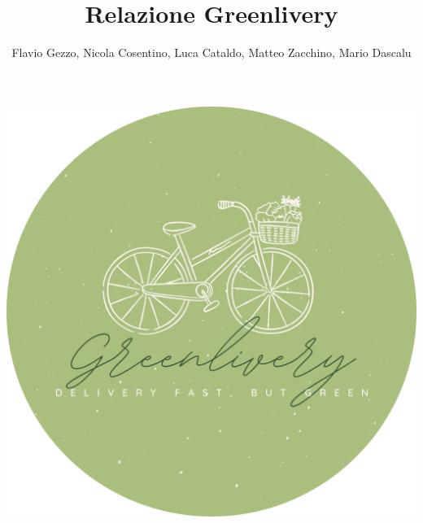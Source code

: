 \documentclass{article}
\begin{document}
\begin{center}
\includegraphics[width=\textwidth]{Data/logocircle.png}
\title{Relazione Greenlivery}
\author{Flavio Gezzo, Nicola Cosentino, Luca Cataldo, Matteo Zacchino, Mario Dascalu}
\end{center}
\renewcommand{\contentsname}{Indice}

\maketitle
\tableofcontents
\newpage
\end{document}
